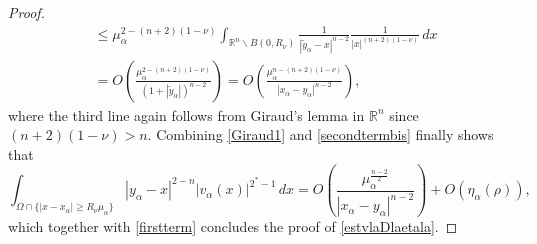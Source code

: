 \documentclass[10pt]{amsart}
\numberwithin{equation}{section}
\newcommand{\R}{\mathbb{R}}
\newcommand{\Om}{\Omega}
\newcommand{\ma}{\mu_\alpha}
\def \xl{x_\alpha}
\def\la{\alpha}
\def \ma{\mu_{\alpha}}
\def \yl{y_{\alpha}}
\def \Ru{R_{\nu}}
\theoremstyle{plain}
\theoremstyle{remark}
\begin{document}
\begin{proof}
\begin{equation}
\begin{aligned}
&  \le \ma^{2 - (n+2)(1-\nu)} \int_{\R^n \backslash B(0,R_\nu)}  \frac{1}{|\tilde{y}_\alpha - x|^{n-2}} \frac{1}{|x|^{(n+2)(1-\nu)}}\, dx \\
& = O \left( \frac{\ma^{2 - (n+2)(1-\nu)}}{(1+ |\tilde{y}_{\alpha}|)^{n-2}}\right) =  O \left( \frac{\ma^{n - (n+2)(1-\nu)}}{|x_\alpha - y_\alpha|^{n-2}}\right),
\end{aligned}
\end{equation}
where the third line again follows from Giraud's lemma in $\R^n$ since $(n+2)(1-\nu) > n$. Combining \eqref{Giraud1} and \eqref{secondtermbis} finally shows that 
$$ 	\int_{\Om \cap \{|x-\xl|\geq \Ru \ma\}}|\yl-x|^{2-n} \big|v_{\la}(x)\big|^{2^*-1}\, dx = O \left( \frac{\ma^{\frac{n-2}{2}}}{|x_\alpha - y_\alpha|^{n-2}}\right) + O(\eta_\alpha(\rho)),$$
which together with  \eqref{firstterm} concludes the proof of \eqref{estvlaDlaetala}.


\end{proof}
\end{document}

